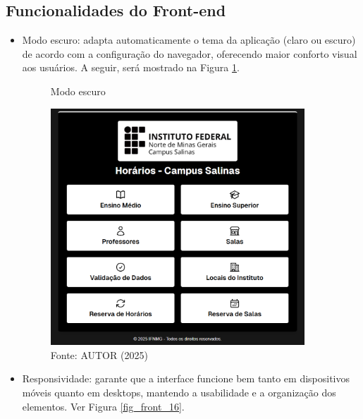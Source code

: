 \subsection{Funcionalidades do Front-end}

\begin{itemize}
    \item Modo escuro: adapta automaticamente o tema da aplicação (claro ou escuro) de acordo com a configuração do navegador, oferecendo maior conforto visual aos usuários. A seguir, será mostrado na Figura \ref{fig_front_15}.

    \begin{figure}[H]
        \centering
        \caption{Modo escuro}
        \includegraphics[width=0.9\textwidth]{Figuras/front-15.png}
        \caption*{Fonte: AUTOR (2025)}
        \label{fig_front_15}
    \end{figure}

    \item Responsividade: garante que a interface funcione bem tanto em dispositivos móveis quanto em desktops, mantendo a usabilidade e a organização dos elementos. Ver Figura \ref{fig_front_16}.


\end{itemize}
